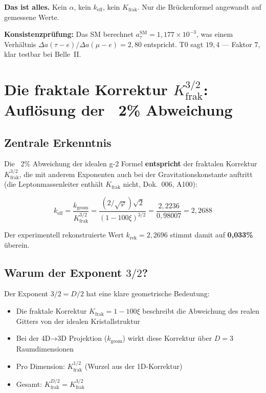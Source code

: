 	\textbf{Das ist alles.} Kein $\alpha$, kein $k_\text{eff}$, kein $K_\text{frak}$. Nur die Brückenformel angewandt auf gemessene Werte.
	
	\textbf{Konsistenzprüfung:} Das SM berechnet $a_\tau^\text{SM} = 1{,}177 \times 10^{-3}$, was einem Verhältnis $\Delta a(\tau{-}e)/\Delta a(\mu{-}e) = 2{,}80$ entspricht. T0 sagt $19{,}4$ — Faktor $7$, klar testbar bei Belle~II.
	
	\section{Die fraktale Korrektur $K_\text{frak}^{3/2}$: Auflösung der ~2\% Abweichung}
	
	\subsection{Zentrale Erkenntnis}
	
	Die ~2\% Abweichung der idealen g-2 Formel \textbf{entspricht} der fraktalen Korrektur $K_\text{frak}^{3/2}$, die mit anderem Exponenten auch bei der Gravitationskonstante auftritt (die Leptonmassenleiter enthält $K_\text{frak}$ nicht, Dok.~006, A100):
	
	\begin{equation}
		\boxed{k_\text{eff} = \frac{k_\text{geom}}{K_\text{frak}^{3/2}} = \frac{(2/\sqrt{\varphi})\sqrt{2}}{(1-100\xi)^{3/2}} = \frac{2{,}2236}{0{,}98007} = 2{,}2688}
	\end{equation}
	
	Der experimentell rekonstruierte Wert $k_\text{rek} = 2{,}2696$ stimmt damit auf \textbf{0{,}033\%} überein.
	
	\subsection{Warum der Exponent $3/2$?}
	
	Der Exponent $3/2 = D/2$ hat eine klare geometrische Bedeutung:
	\begin{itemize}
		\item Die fraktale Korrektur $K_\text{frak} = 1 - 100\xi$ beschreibt die Abweichung des realen Gitters von der idealen Kristallstruktur
		\item Bei der 4D→3D Projektion ($k_\text{geom}$) wirkt diese Korrektur über $D = 3$ Raumdimensionen
		\item Pro Dimension: $K_\text{frak}^{1/2}$ (Wurzel aus der 1D-Korrektur)
		\item Gesamt: $K_\text{frak}^{D/2} = K_\text{frak}^{3/2}$
	\end{itemize}
	
